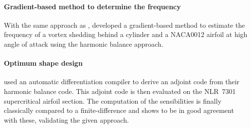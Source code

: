 
\paragraph{Gradient-based method to determine the frequency}
With the same approach as \citet{McMullen2002}, \citet{Gopinath2006}
developed a gradient-based method to estimate the frequency of a 
vortex shedding behind a cylinder and a NACA0012 airfoil 
at high angle of attack using the harmonic balance approach.

\paragraph{Optimum shape design}
\citet{Thomas2005b} used an automatic 
differentiation compiler to derive an adjoint code
from their harmonic balance code. This adjoint code is then
evaluated on the NLR~7301 supercritical airfoil section.
The computation of the sensibilities is finally
classically compared to a finite-difference and shows
to be in good agreement with these, validating
the given approach.

